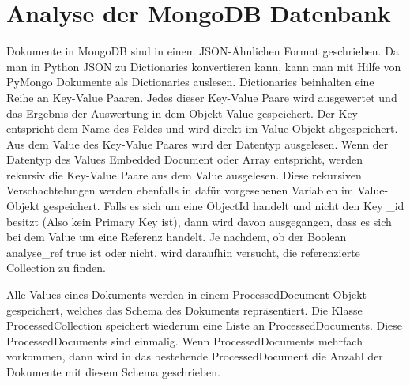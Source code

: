 \section{Analyse der MongoDB Datenbank}
\label{sec:mongoDB_analyse}

Dokumente in MongoDB sind in einem JSON-Ähnlichen Format geschrieben.
Da man in Python JSON zu Dictionaries konvertieren kann, kann man mit Hilfe von PyMongo Dokumente als Dictionaries auslesen.
Dictionaries beinhalten eine Reihe an Key-Value Paaren.
Jedes dieser Key-Value Paare wird ausgewertet und das Ergebnis der Auswertung in dem Objekt Value gespeichert.
Der Key entspricht dem Name des Feldes und wird direkt im Value-Objekt abgespeichert.
Aus dem Value des Key-Value Paares wird der Datentyp ausgelesen.
Wenn der Datentyp des Values Embedded Document oder Array entspricht, werden rekursiv die Key-Value Paare aus dem Value ausgelesen. 
Diese rekursiven Verschachtelungen werden ebenfalls in dafür vorgesehenen Variablen im Value-Objekt gespeichert.
Falls es sich um eine ObjectId handelt und nicht den Key \_id besitzt (Also kein Primary Key ist), dann wird davon ausgegangen, dass es sich bei dem Value um eine Referenz handelt.
Je nachdem, ob der Boolean analyse\_ref true ist oder nicht, wird daraufhin versucht, die referenzierte Collection zu finden. 

Alle Values eines Dokuments werden in einem ProcessedDocument Objekt gespeichert, welches das Schema des Dokuments repräsentiert.
Die Klasse ProcessedCollection speichert wiederum eine Liste an ProcessedDocuments.
Diese ProcessedDocuments sind einmalig.
Wenn ProcessedDocuments mehrfach vorkommen, dann wird in das bestehende ProcessedDocument die Anzahl der Dokumente mit diesem Schema geschrieben.

